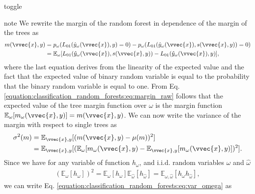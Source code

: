 \documentclass[letterpaper,10pt,english]{jupyterBook}
\begin{document}
\begin{sphinxuseclass}{toggle}
\begin{sphinxadmonition}{note}
\sphinxAtStartPar
We rewrite the margin of the random forest in dependence of the margin of the trees as
\begin{equation}\label{equation:classification_random_forests:eq:margin_raw}
\begin{split}\begin{align*}
m(\vvec{x},y)&= p_\omega(L_{01}(\hat{y}_\omega(\vvec{x}),y)=0) - p_\omega(L_{01}(\hat{y}_\omega(\vvec{x}), s(\vvec{x},y))=0)\\
&=\mathbb{E}_\omega[L_{01}(\hat{y}_\omega(\vvec{x}), s(\vvec{x},y)) - L_{01}(\hat{y}_\omega(\vvec{x}),y)],
\end{align*}\end{split}
\end{equation}
\sphinxAtStartPar
where the last equation derives from the linearity of the expected value and the fact that the expected value of binary random variable is equal to the probability that the binary random variable is equal to one.
From Eq. \eqref{equation:classification_random_forests:eq:margin_raw} follows that the expected value of the tree margin function over \(\omega\) is the margin function \(\mathbb{E}_\omega[m_\omega(\vvec{x},y)]=m(\vvec{x},y)\).
We can now write the variance of the margin with respect to single trees as
\begin{equation}\label{equation:classification_random_forests:eq:var_omega}
\begin{split}\begin{align*}
\sigma^2(m) &= \mathbb{E}_{\vvec{x},y}[(m(\vvec{x},y)-\mu(m))^2]\\
&= \mathbb{E}_{\vvec{x},y}[(\mathbb{E}_\omega[m_\omega(\vvec{x},y)-\mathbb{E}_{\vvec{x},y}[m_\omega(\vvec{x},y)])^2].
\end{align*}\end{split}
\end{equation}
\sphinxAtStartPar
Since we have for any variable of function \(h_\omega\), and i.i.d. random variables \(\omega\) and \(\hat{\omega}\)
\begin{equation*}
\begin{split}(\mathbb{E}_\omega[h_\omega])^2 =\mathbb{E}_\omega[h_\omega]\mathbb{E}_\hat{\omega}[h_\hat{\omega}] = \mathbb{E}_{\omega,\hat{\omega}}[h_\omega h_\hat{\omega}], \end{split}
\end{equation*}
we can write Eq. \eqref{equation:classification_random_forests:eq:var_omega} as
\begin{equation}\label{equation:classification_random_forests:eq:var2}

\end{equation}
\end{sphinxadmonition}
\end{sphinxuseclass}
\end{document}
